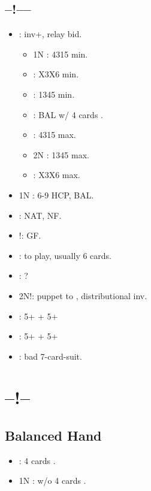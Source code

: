 \documentclass[12pt,twoside,a5paper]{report}%
\begin{document}
		\subsection*{--!----}
		\begin{itemize}
		\renewcommand{\labelitemi}{}		
			\item {} : inv+, relay bid.
			\begin{itemize}
				\item 1N : 4315 min.
				\item {} : X3X6 min.
				\item {} : 1345 min.
				\item {} : BAL w/ 4 cards \he{}.
				\item {} : 4315 max.
				\item 2N : 1345 max.
				\item {} : X3X6 max.
			\end{itemize}
			\item 1N : 6-9 HCP, BAL.
			\item {} : NAT, NF.
			\item {}!: GF.
			\item {} : to play, usually 6 cards.
			\item {} : ?
			\item 2N!: puppet to , distributional inv.
			\item {} : 5+\he{} + 5+\cl{}
			\item {} : 5+\he{} + 5+\di{}
			\item {} : bad 7-card-suit.
		\end{itemize}

	\section*{--!--}
		\subsection*{Balanced Hand}
		\begin{itemize}
		\renewcommand{\labelitemi}{}
			\item {} : 4 cards \sp{}.
			\item 1N : w/o 4 cards \sp{}.
		\end{itemize}
\end{document}
